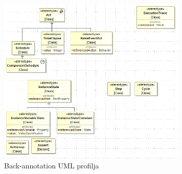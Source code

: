 \begin{figure}[!ht]
	\centering
	\includegraphics[width=90mm, keepaspectratio]{figures/contribution/trace-model.png}
	\caption{Back-annotation UML profilja}
	\label{fig:contribution-trace-profile}
\end{figure}

